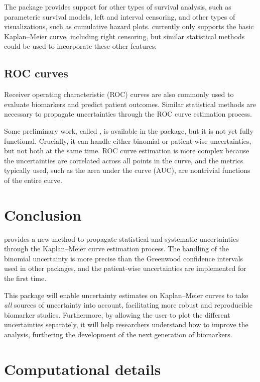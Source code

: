 \documentclass[article]{jss}
\newcommand{\KM}{Kaplan--Meier} %
\begin{document}
The  package provides support for other types of survival analysis, such as parameteric survival models, left and interval censoring, and other types of visualizations, such as cumulative hazard plots\@.  currently only supports the basic \KM{} curve, including right censoring, but similar statistical methods could be used to incorporate these other features.

\subsection{ROC curves}

Receiver operating characteristic (ROC) curves are also commonly used to evaluate biomarkers and predict patient outcomes. Similar statistical methods are necessary to propagate uncertainties through the ROC curve estimation process.

Some preliminary work, called , is available in the  package, but it is not yet fully functional. Crucially, it can handle either binomial or patient-wise uncertainties, but not both at the same time. ROC curve estimation is more complex because the uncertainties are correlated across all points in the curve, and the metrics typically used, such as the area under the curve (AUC), are nontrivial functions of the entire curve.

\section{Conclusion}

 provides a new method to propagate statistical and systematic uncertainties through the \KM{} curve estimation process. The handling of the binomial uncertainty is more precise than the Greenwood confidence intervals used in other packages, and the patient-wise uncertainties are implemented for the first time.

This package will enable uncertainty estimates on \KM{} curves to take \emph{all} sources of uncertainty into account, facilitating more robust and reproducible biomarker studies. Furthermore, by allowing the user to plot the different uncertainties separately, it will help researchers understand how to improve the analysis, furthering the development of the next generation of biomarkers.

\section*{Computational details}
\end{document}
